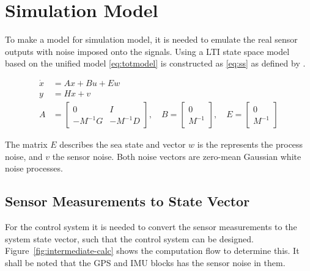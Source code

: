\chapter{Simulation Model} 

To make a model for simulation model, it is needed to emulate the real
sensor outputs with noise imposed onto the signals. Using a \ac{LTI}
state space model based on the unified model \vref{eq:totmodel} is
constructed as \vref{eq:ss} as defined by \citep[p. 175]{fossen}.

\begin{subequations}
\begin{align}
	\dot x &=  A x + B u + E w \\
	y &= H x + v \\
	A &=
	\begin{bmatrix}
		0 & I\\ -M^{-1}G & -M^{-1}D
	\end{bmatrix}, \quad
	B = 
	\begin{bmatrix}
		0 \\ M^{-1}
	\end{bmatrix}, \quad
	E =
	\begin{bmatrix}
		0 \\ M^{-1}
	\end{bmatrix}
\end{align}
\label{eq:ss}
\end{subequations}

The matrix $E$ describes the sea state and vector $w$ is the
represents the process noise, and $v$ the sensor noise. Both noise
vectors are zero-mean Gaussian white noise processes.


\section{Sensor Measurements to State Vector}
For the control system it is needed to convert the sensor measurements
to the system state vector, such that the control system can be
designed. Figure~\vref{fig:intermediate-calc} shows the computation
flow to determine this. It shall be noted that the \ac{GPS} and
\ac{IMU} blocks has the sensor noise in them.

